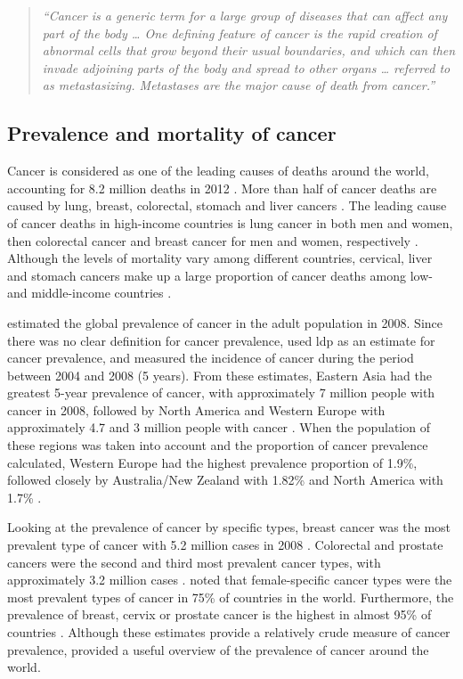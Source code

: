 \begin{quote}
	\textit{
	``Cancer is a generic term for a large group of diseases that can affect any part of the body \ldots{}
	One defining feature of cancer is the rapid creation of abnormal cells that grow beyond their usual boundaries, and which can then invade adjoining parts of the body and spread to other organs \ldots{}
	referred to as metastasizing.
	Metastases are the major cause of death from cancer.''
	\citep{WHO2016}
	}
\end{quote}

\subsection{Prevalence and mortality of cancer}
\label{sub:prevalence_and_mortality_of_cancer}

Cancer is considered as one of the leading causes of deaths around the world, accounting for 8.2 million deaths in 2012 \citep{WHO2014}.
More than half of cancer deaths are caused by lung, breast, colorectal, stomach and liver cancers \citep{WHO2014}.
The leading cause of cancer deaths in high-income countries is lung cancer in both men and women, then colorectal cancer and breast cancer for men and women, respectively \citep{WHO2014}.
Although the levels of mortality vary among different countries, cervical, liver and stomach cancers make up a large proportion of cancer deaths among low- and middle-income countries \citep{WHO2014}.

\citet{Bray2013} estimated the global prevalence of cancer in the adult population in 2008.
Since there was no clear definition for cancer prevalence, \citet{Bray2013} used \gls{ldp} as an estimate for cancer prevalence, and measured the incidence of cancer during the period between 2004 and 2008 (5 years).
From these estimates, Eastern Asia had the greatest 5-year prevalence of cancer, with approximately 7 million people with cancer in 2008, followed by North America and Western Europe with approximately 4.7 and 3 million people with cancer \citep{Bray2013}.
When the population of these regions was taken into account and the proportion of cancer prevalence calculated, Western Europe had the highest prevalence proportion of 1.9\%, followed closely by Australia/New Zealand with 1.82\% and North America with 1.7\% \citep{Bray2013}.

Looking at the prevalence of cancer by specific types, breast cancer was the most prevalent type of cancer with 5.2 million cases in 2008 \citep{Bray2013}.
Colorectal and prostate cancers were the second and third most prevalent cancer types, with approximately 3.2 million cases \citep{Bray2013}.
\citet{Bray2013} noted that female-specific cancer types were the most prevalent types of cancer in 75\% of countries in the world.
Furthermore, the prevalence of breast, cervix or prostate cancer is the highest in almost 95\% of countries \citep{Bray2013}.
Although these estimates provide a relatively crude measure of cancer prevalence, \citet{Bray2013} provided a useful overview of the prevalence of cancer  around the world.


